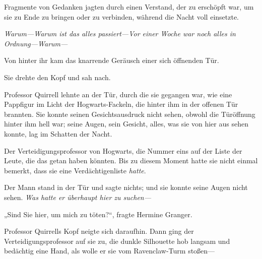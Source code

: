 Fragmente von Gedanken jagten durch einen Verstand, der zu erschöpft war, um sie zu Ende zu bringen oder zu verbinden, während die Nacht voll einsetzte.




\emph{Warum—Warum ist das alles passiert—Vor einer Woche war noch alles in Ordnung—Warum—}

Von hinter ihr kam das knarrende Geräusch einer sich öffnenden Tür.

Sie drehte den Kopf und sah nach.

Professor Quirrell lehnte an der Tür, durch die sie gegangen war, wie eine Pappfigur im Licht der Hogwarts-Fackeln, die hinter ihm in der offenen Tür brannten. Sie konnte seinen Gesichtsausdruck nicht sehen, obwohl die Türöffnung hinter ihm hell war; seine Augen, sein Gesicht, alles, was sie von hier aus sehen konnte, lag im Schatten der Nacht.

Der Verteidigungsprofessor von Hogwarts, die Nummer eins auf der Liste der Leute, die das getan haben könnten. Bis zu diesem Moment hatte sie nicht einmal bemerkt, dass sie eine Verdächtigenliste \emph{hatte}.

Der Mann stand in der Tür und sagte nichts; und sie konnte seine Augen nicht sehen. \emph{Was hatte er überhaupt hier zu suchen—}

„Sind Sie hier, um mich zu töten?“, fragte Hermine Granger.

Professor Quirrells Kopf neigte sich daraufhin.
%
Dann ging der Verteidigungsprofessor auf sie zu, die dunkle Silhouette hob langsam und bedächtig eine Hand, als wolle er sie vom Ravenclaw-Turm stoßen—

